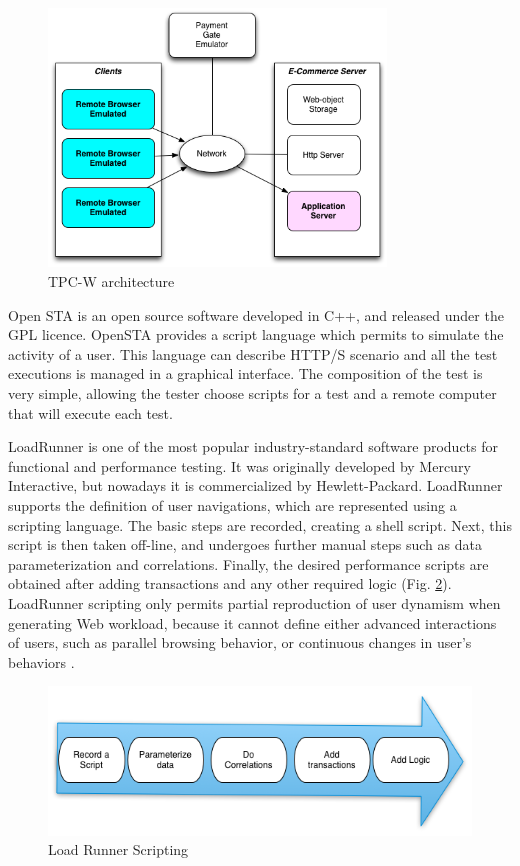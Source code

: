 \begin{figure}[h]
\centering
\includegraphics[width=0.8\textwidth]{./images/tpcw.png}
\caption{TPC-W architecture \cite{MohammadS.Obaidat} \cite{Menasce2002a}}
\label{fig:tpcw}
\end{figure}


Open STA is an open source software developed in C++, and released under the GPL licence. OpenSTA provides a script language which permits to simulate the activity of a user. This language can describe HTTP/S scenario and all the test executions is managed in a graphical interface. The composition of the test is
very simple, allowing the tester choose scripts for a test and a remote computer that will execute each test.


LoadRunner is one of the most popular industry-standard software products for functional and performance testing. It was originally developed by Mercury Interactive, but nowadays it is commercialized by Hewlett-Packard. LoadRunner supports the definition of user navigations, which are represented using a scripting language. The basic steps are recorded, creating a shell script. Next, this script is then taken off-line, and undergoes further manual steps such as data parameterization and correlations. Finally, the desired performance scripts are obtained after adding transactions and any other required logic (Fig. \ref{fig:loadrunner}). LoadRunner scripting only permits partial reproduction of user dynamism when generating Web workload, because it cannot define either advanced interactions of users, such as parallel browsing behavior, or continuous changes in user’s behaviors \cite{MohammadS.Obaidat}.

\begin{figure}[!ht]
\centering
\includegraphics[width=1\textwidth]{./images/loadrunner.png}
\caption{Load Runner Scripting}
\label{fig:loadrunner}
\end{figure}



